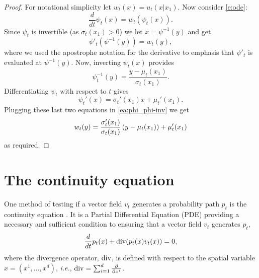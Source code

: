 \documentclass{article}
\makeatletter
\renewcommand*{\ie}{{\it i.e.}\@\xspace}
\makeatother
\begin{document}
\condvf*
\begin{proof}
For notational simplicity let $w_t(x)=u_t(x\vert x_1)$. Now consider \eqref{e:ode}:
\begin{equation*}
    \frac{d}{dt}\psi_t(x) = w_t(\psi_t(x)).
\end{equation*}
Since $\psi_t$ is invertible (as $\sigma_t(x_1)>0$) we let $x=\psi^{-1}(y)$ and get
\begin{equation}\label{ea:phi_phi-inv}
    \psi'_t(\psi^{-1}(y)) = w_t(y),
\end{equation}
where we used the apostrophe notation for the derivative to emphasis that $\psi'_t$ is evaluated at $\psi^{-1}(y)$. Now, inverting $\psi_t(x)$ provides
\begin{equation*}
    \psi_t^{-1}(y)=\frac{y-\mu_t(x_1)}{\sigma_t(x_1)}.
\end{equation*}
Differentiating $\psi_t$ with respect to $t$ gives
\begin{equation*}
    \psi_t'(x)=\sigma_t'(x_1)x + \mu_t'(x_1).
\end{equation*}
Plugging these last two equations in \eqref{ea:phi_phi-inv} we get
\begin{equation*}
    w_t(y) = \frac{\sigma'_t(x_1)}{\sigma_t(x_1)}\left (y-\mu_t(x_1)\right ) + \mu_t'(x_1)
\end{equation*}
as required. 
\end{proof}


\section{The continuity equation}
\label{A:continuity_equation}
One method of testing if a vector field $v_t$ generates a probability path $p_t$ is the continuity equation \citep{villani2009optimal}. It is a Partial Differential Equation (PDE) providing a necessary and sufficient condition to ensuring that a vector field $v_t$ generates $p_t$,
\begin{equation}\label{e:continuity}
    \frac{d}{dt}p_t(x) + \mathrm{div}(p_t(x) v_t(x)) = 0,
\end{equation}
where the divergence operator, $\mathrm{div}$, is defined with respect to the spatial variable $x=(x^1,\ldots,x^d)$, \ie, $\mathrm{div}=\sum_{i=1}^d \frac{\partial }{\partial x^i}$. 

\end{document}
